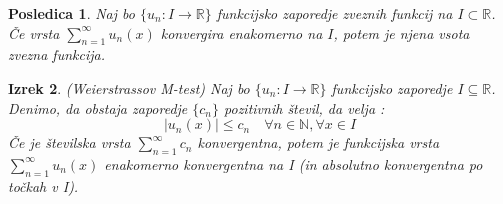 \documentclass[11pt]{article}
\newtheorem{Izrek}{{\sc Izrek}}[section]
\newtheorem{Posledica}[Izrek]{{\sc Posledica}}
\begin{document}
\begin{Posledica}
	Naj bo  $\{u_n : I \to \mathbb{R} \}$ funkcijsko zaporedje zveznih funkcij na $I \subset \mathbb{R}$. Če vrsta $\sum_{n=1}^{\infty}{u_n(x)} $ konvergira enakomerno na $I$, potem je njena vsota zvezna funkcija.
\end{Posledica}
\begin{Izrek}
	(Weierstrassov M-test)
	Naj bo  $\{u_n : I \to \mathbb{R} \}$ funkcijsko zaporedje $I\subseteq \mathbb{R}$. Denimo, da obstaja zaporedje $\{c_n\}$ pozitivnih števil, da velja :
	$$|u_n(x)| \le c_n \quad \forall n\in \mathbb{N}, \forall x\in I$$
	Če je številska vrsta $\sum_{n=1}^{\infty}{c_n}$ konvergentna, potem je funkcijska vrsta $\sum_{n=1}^{\infty}{u_n(x)}$ enakomerno konvergentna na I (in absolutno konvergentna po točkah v I).
\end{Izrek}
\end{document}
